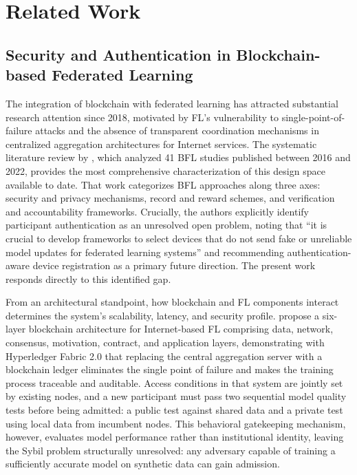 \documentclass{sbc2023}
\begin{document}
\section{Related Work}
\label{sec:related}

\subsection{Security and Authentication in Blockchain-based Federated Learning}

The integration of blockchain with federated learning has attracted substantial research attention since 2018, motivated by FL's vulnerability to single-point-of-failure attacks and the absence of transparent coordination mechanisms in centralized aggregation architectures for Internet services. The systematic literature review by \citet{qammar2023securing}, which analyzed 41 BFL studies published between 2016 and 2022, provides the most comprehensive characterization of this design space available to date. That work categorizes BFL approaches along three axes: security and privacy mechanisms, record and reward schemes, and verification and accountability frameworks. Crucially, the authors explicitly identify participant authentication as an unresolved open problem, noting that ``it is crucial to develop frameworks to select devices that do not send fake or unreliable model updates for federated learning systems'' and recommending authentication-aware device registration as a primary future direction. The present work responds directly to this identified gap.

From an architectural standpoint, how blockchain and FL components interact determines the system's scalability, latency, and security profile. \citet{xu2021method} propose a six-layer blockchain architecture for Internet-based FL comprising data, network, consensus, motivation, contract, and application layers, demonstrating with Hyperledger Fabric 2.0 that replacing the central aggregation server with a blockchain ledger eliminates the single point of failure and makes the training process traceable and auditable. Access conditions in that system are jointly set by existing nodes, and a new participant must pass two sequential model quality tests before being admitted: a public test against shared data and a private test using local data from incumbent nodes. This behavioral gatekeeping mechanism, however, evaluates model performance rather than institutional identity, leaving the Sybil problem structurally unresolved: any adversary capable of training a sufficiently accurate model on synthetic data can gain admission.
\end{document}

